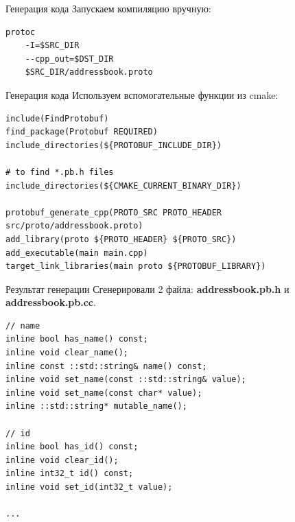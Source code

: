 \documentclass{beamer}
\begin{document}
\begin{frame}[fragile]{Генерация кода}
    Запускаем компиляцию вручную:
\begin{lstlisting}
protoc 
    -I=$SRC_DIR 
    --cpp_out=$DST_DIR 
    $SRC_DIR/addressbook.proto
\end{lstlisting}
\end{frame}

\begin{frame}[fragile]{Генерация кода}
    Используем вспомогательные функции из cmake:
    \small
\begin{lstlisting}
include(FindProtobuf)
find_package(Protobuf REQUIRED)
include_directories(${PROTOBUF_INCLUDE_DIR})

# to find *.pb.h files
include_directories(${CMAKE_CURRENT_BINARY_DIR})

protobuf_generate_cpp(PROTO_SRC PROTO_HEADER src/proto/addressbook.proto)
add_library(proto ${PROTO_HEADER} ${PROTO_SRC})
add_executable(main main.cpp)
target_link_libraries(main proto ${PROTOBUF_LIBRARY})
\end{lstlisting}
\end{frame}

\begin{frame}[fragile]{Результат генерации}
    Сгенерировали 2 файла: {\bf addressbook.pb.h} и {\bf addressbook.pb.cc}.
    \small
\begin{lstlisting}
// name
inline bool has_name() const;
inline void clear_name();
inline const ::std::string& name() const;
inline void set_name(const ::std::string& value);
inline void set_name(const char* value);
inline ::std::string* mutable_name();

// id
inline bool has_id() const;
inline void clear_id();
inline int32_t id() const;
inline void set_id(int32_t value);

...

\end{lstlisting}
\end{frame}
\end{document}
